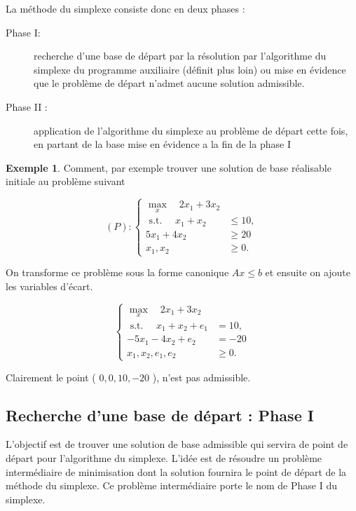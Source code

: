 \documentclass[a4paper,12pt,openany]{book}
\theoremstyle{plain}
\theoremstyle{definition}
\newtheorem{exemple}[theorem]{Exemple}
\theoremstyle{remark}
\theoremstyle{nbstyle}
\begin{document}
	La méthode du simplexe consiste donc en deux phases :\\
	
	\begin{description}
		\item[Phase I:] recherche d'une base de départ par la résolution par l'algorithme du simplexe du programme auxiliaire (définit plus loin) ou mise en évidence que le problème de départ n'admet aucune solution admissible.
		
		\item[Phase II :] application de l'algorithme du simplexe au problème de départ cette fois, en partant de la base mise en évidence a la fin de la phase I
	\end{description}
	
	\begin{exemple}
		Comment, par exemple trouver une solution de base réalisable initiale au problème suivant
		
		$$
		(P):\left\{\begin{aligned}
		\displaystyle\max_{x} \quad 2 x_{1}+3 x_{2} & \\
		\text { s.t. } \quad x_{1}+x_{2} & \leq 10, \\
		5 x_{1}+4 x_{2} & \geq 20 \\
		x_{1}, x_{2} & \geq 0 .
		\end{aligned}\right.
		$$
		
		On transforme ce problème sous la forme canonique $A x \leq b$ et ensuite on ajoute les variables d'écart.
		
		\begin{equation}\label{eq3.3}
		\left\{\begin{aligned}
		\max_{x} \quad 2 x_{1}+3 x_{2} & \\
		\text { s.t. } \quad x_{1}+x_{2}+e_{1} & =10, \\
		-5 x_{1}-4 x_{2}+e_{2} & =-20 \\
		x_{1}, x_{2}, e_{1}, e_{2} & \geq 0 .
		\end{aligned}\right.
		\end{equation}
		
		Clairement le point ( $0,0,10,-20$ ), n'est pas admissible.
	\end{exemple}
	
	\subsection{Recherche d'une base de départ : Phase I}
	L'objectif est de trouver une solution de base admissible qui servira de point de départ pour l'algorithme du simplexe. L'idée est de résoudre un problème intermédiaire de minimisation dont la solution fournira le point de départ de la méthode du simplexe. Ce problème intermédiaire porte le nom de Phase I du simplexe.
	
\end{document}
